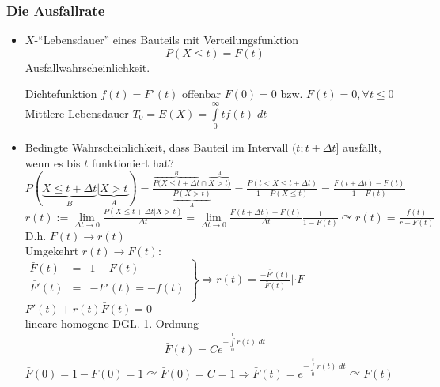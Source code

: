 \documentclass[a4paper]{scrartcl}
\begin{document}
\subsubsection{Die Ausfallrate}
\begin{itemize}
\item $X$-"`Lebensdauer"' eines Bauteils mit Verteilungsfunktion
\[ P(X \leq t) = F(t) \]
Ausfallwahrscheinlichkeit.

Dichtefunktion $f(t) = F'(t)$ offenbar $F(0) = 0$ bzw. $F(t) = 0 , \forall t \leq 0$\\
Mittlere Lebensdauer $T_0 = E(X) = \int\limits_0^\infty t f(t) \; dt$

\item Bedingte Wahrscheinlichkeit, dass Bauteil im Intervall $(t; t + \Delta t]$ ausfällt, wenn es bis $t$ funktioniert hat?\\
$P(\underbrace{X \leq t + \Delta t}_{B} | \underbrace{X > t}_{A} ) = \frac{\overbrace{P(X \leq t + \Delta t}^{B} \cap \overbrace{X > t)}^{A}}{\underbrace{P(X>t)}_{A}} = \frac{ P(t < X \leq t + \Delta t)}{1 - P(X \leq t)} = \frac{F(t + \Delta t) - F(t)}{1-F(t)}$\\
$r(t) := \lim\limits_{\Delta t \to 0} \frac{P(X \leq t + \Delta t | X > t)}{\Delta t} = \lim\limits_{\Delta t \to 0} \frac{F(t+ \Delta t) - F(t)}{\Delta t} \frac{1}{1-F(t)} \curvearrowright r(t) = \frac{f(t)}{r-F(t)}$ D.h. $F(t) \rightarrow r(t)$\\
Umgekehrt $r(t) \rightarrow F(t):$\\
$\left. \begin{array}{ccc} \bar{F}(t) & = & 1 - F(t) \\ \bar{F'} (t) & = & - F'(t) = -f(t) \\ \end{array} \right\} \Rightarrow r(t) = \frac{-\bar{F'} (t)}{\bar{F}(t)} | \cdot F$\\
$\bar{F'} (t) + r(t) \bar{F}(t) = 0$\\
lineare homogene DGL. 1. Ordnung
\[ \bar{F}(t) = C e^{- \int\limits_0^t r(t) \; dt}\]
$\bar{F} (0) = 1 - F(0) = 1 \curvearrowright \bar{F} (0) = C = 1 \Rightarrow \bar{F}(t) = e^{-\int\limits_0^t r(t) \; dt} \curvearrowright F(t)$

\end{itemize}
\end{document}
